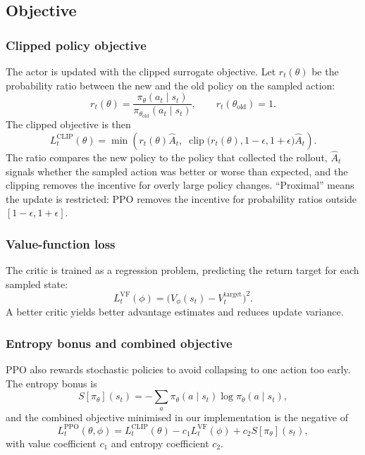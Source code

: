 \documentclass{article}
\begin{document}
\subsection{Objective}

\subsubsection{Clipped policy objective}

The actor is updated with the clipped surrogate objective. Let $r_t(\theta)$ be the probability ratio between the new and the old policy on the sampled action:
\[
  r_t(\theta) = \frac{\pi_\theta(a_t\mid s_t)}{\pi_{\theta_{\mathrm{old}}}(a_t\mid s_t)}, \qquad r_t(\theta_{\mathrm{old}}) = 1.
\]
The clipped objective is then
\[
  L_t^{\mathrm{CLIP}}(\theta) = \min\!\left( r_t(\theta)\hat{A}_t,\; \operatorname{clip}\bigl(r_t(\theta), 1-\epsilon, 1+\epsilon\bigr)\hat{A}_t \right).
\]
The ratio compares the new policy to the policy that collected the rollout, $\hat{A}_t$ signals whether the sampled action was better or worse than expected, and the clipping removes the incentive for overly large policy changes. ``Proximal'' means the update is restricted: PPO removes the incentive for probability ratios outside $[1-\epsilon, 1+\epsilon]$.

\subsubsection{Value-function loss}

The critic is trained as a regression problem, predicting the return target for each sampled state:
\[
  L_t^{\mathrm{VF}}(\phi) = \bigl(V_\phi(s_t) - V_t^{\mathrm{target}}\bigr)^2.
\]
A better critic yields better advantage estimates and reduces update variance.

\subsubsection{Entropy bonus and combined objective}

PPO also rewards stochastic policies to avoid collapsing to one action too early. The entropy bonus is
\[
  S[\pi_\theta](s_t) = -\sum_a \pi_\theta(a\mid s_t)\log \pi_\theta(a\mid s_t),
\]
and the combined objective minimised in our implementation is the negative of
\[
  L_t^{\mathrm{PPO}}(\theta, \phi) = L_t^{\mathrm{CLIP}}(\theta) - c_1 L_t^{\mathrm{VF}}(\phi) + c_2 S[\pi_\theta](s_t),
\]
with value coefficient $c_1$ and entropy coefficient $c_2$.
\end{document}
